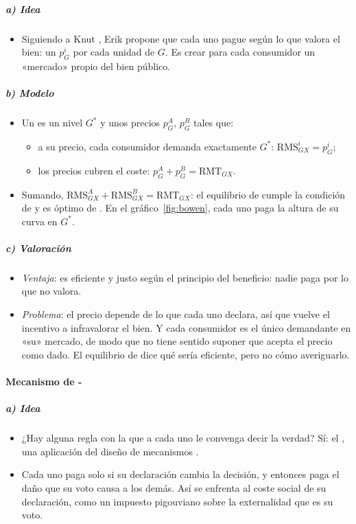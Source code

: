 \documentclass[11pt]{article}
\begin{document}
\subparagraph{a) Idea}
\begin{itemize}
\item Siguiendo a Knut \textcite{Wicksell1896Finanztheoretische}, Erik \textcite{Lindahl1919Gerechtigkeit} propone que cada uno pague según lo que valora el bien: un  $p^i_G$ por cada unidad de $G$. Es crear para cada consumidor un «mercado» propio del bien público.
\end{itemize}

\subparagraph{b) Modelo}
\begin{itemize}
\item Un  es un nivel $G^*$ y unos precios $p^A_G$, $p^B_G$ tales que:
  \begin{itemize}
  \item a su precio, cada consumidor demanda exactamente $G^*$: $\mathrm{RMS}^i_{GX}=p^i_G$;
  \item los precios cubren el coste: $p^A_G+p^B_G=\mathrm{RMT}_{GX}$.
  \end{itemize}
\item Sumando, $\mathrm{RMS}^A_{GX}+\mathrm{RMS}^B_{GX}=\mathrm{RMT}_{GX}$: el equilibrio de  cumple la condición de  y es óptimo de . En el gráfico~\ref{fig:bowen}, cada uno paga la altura de su curva en $G^*$.
\end{itemize}

\subparagraph{c) Valoración}
\begin{itemize}
\item \emph{Ventaja}: es eficiente y justo según el principio del beneficio: nadie paga por lo que no valora.
\item \emph{Problema}: el precio depende de lo que cada uno declara, así que vuelve el incentivo a infravalorar el bien. Y cada consumidor es el único demandante en «su» mercado, de modo que no tiene sentido suponer que acepta el precio como dado\nocite{Samuelson1954Pure}. El equilibrio de  dice qué sería eficiente, pero no cómo averiguarlo.
\end{itemize}

\paragraph{Mecanismo de -}

\subparagraph{a) Idea}
\begin{itemize}
\item ¿Hay alguna regla con la que a cada uno le convenga decir la verdad? Sí: el \nocite{Clarke1971Multipart,Groves1973Incentives}, una aplicación del diseño de mecanismos .
\item Cada uno paga solo si su declaración cambia la decisión, y entonces paga el daño que su voto causa a los demás. Así se enfrenta al coste social de su declaración, como un impuesto pigouviano sobre la externalidad que es su voto.
\end{itemize}
\end{document}
